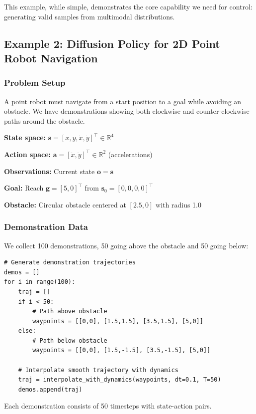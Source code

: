 This example, while simple, demonstrates the core capability we need for control: generating valid samples from multimodal distributions.

\subsection{Example 2: Diffusion Policy for 2D Point Robot Navigation}
\label{subsec:example_point_navigation}

\subsubsection{Problem Setup}

A point robot must navigate from a start position to a goal while avoiding an obstacle. We have demonstrations showing both clockwise and counter-clockwise paths around the obstacle.

\textbf{State space:} $\mathbf{s} = [x, y, \dot{x}, \dot{y}]^\top \in \mathbb{R}^4$

\textbf{Action space:} $\mathbf{a} = [\ddot{x}, \ddot{y}]^\top \in \mathbb{R}^2$ (accelerations)

\textbf{Observations:} Current state $\mathbf{o} = \mathbf{s}$

\textbf{Goal:} Reach $\mathbf{g} = [5, 0]^\top$ from $\mathbf{s}_0 = [0, 0, 0, 0]^\top$

\textbf{Obstacle:} Circular obstacle centered at $[2.5, 0]$ with radius 1.0

\subsubsection{Demonstration Data}

We collect 100 demonstrations, 50 going above the obstacle and 50 going below:

\begin{verbatim}
# Generate demonstration trajectories
demos = []
for i in range(100):
    traj = []
    if i < 50:
        # Path above obstacle
        waypoints = [[0,0], [1.5,1.5], [3.5,1.5], [5,0]]
    else:
        # Path below obstacle
        waypoints = [[0,0], [1.5,-1.5], [3.5,-1.5], [5,0]]

    # Interpolate smooth trajectory with dynamics
    traj = interpolate_with_dynamics(waypoints, dt=0.1, T=50)
    demos.append(traj)
\end{verbatim}

Each demonstration consists of 50 timesteps with state-action pairs.

